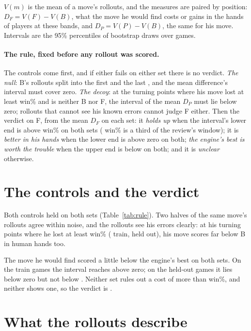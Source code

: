 \documentclass[11pt]{article}
\begin{document}
$V(m)$ is the mean of a move's \Rollouts{} rollouts, and the measures are paired by position:
$D_F = V(F) - V(B)$, what the move he would find costs or gains in the hands of players at these
bands, and $D_P = V(P) - V(B)$, the same for his move. Intervals are the 95\% percentiles of
\Draws{} bootstrap draws over games.

\paragraph{The rule, fixed before any rollout was scored.} The controls come first, and if
either fails on either set there is no verdict. \emph{The null}: B's rollouts split into the
first \HalfRollouts{} and the last \HalfRollouts, and the mean difference's interval must cover
zero. \emph{The decoy}: at the turning points where his move lost at least \DecoyDrop{} win\%
and is neither B nor F, the interval of the mean $D_P$ must lie below zero; rollouts that cannot
see his known errors cannot judge F either. Then the verdict on F, from the mean $D_F$ on each
set: it \emph{holds up} when the interval's lower end is above \NegMargin{} win\% on both sets (\Margin{} win\%
is a third of the review's window); it is \emph{better in his hands} when the lower end is above
zero on both; \emph{the engine's best is worth the trouble} when the upper end is below \NegMargin{} on
both; and it is \emph{unclear} otherwise.

\section{The controls and the verdict}

\RuleTable

Both controls held on both sets (Table~\ref{tab:rule}). Two halves of the same move's rollouts
agree within noise, and the rollouts see his errors clearly: at his turning points where he lost
at least \DecoyDrop{} win\% (\DecoyTrainN{} train, \DecoyHeldN{} held out), his move scores far
below B in human hands too.

The move he would find scored a little below the engine's best on both sets. On the train games
the interval reaches above zero; on the held-out games it lies below zero but not below \NegMargin.
Neither set rules out a cost of more than \Margin{} win\%, and neither shows one, so the verdict
is \emph{\Verdict}.

\section{What the rollouts describe}
\end{document}
